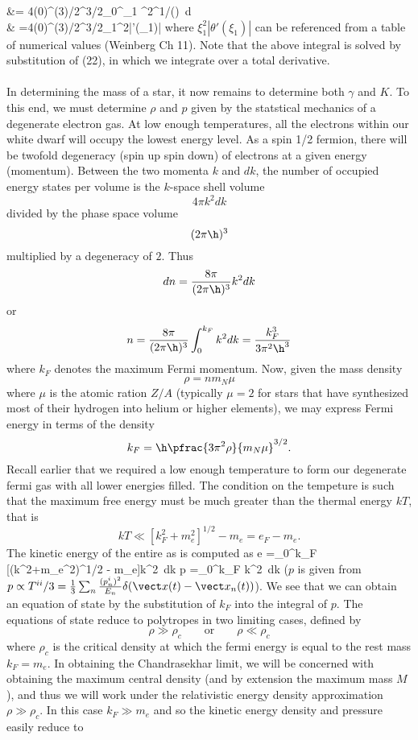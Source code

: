 \documentclass[10pt,letterpaper]{article}
\begin{document}
	&= 4\pi \rho(0)^{(3)/2}^{3/2}\int_0^{\xi_1} \xi^2\theta^{1/()}\ d\xi\\
	& =4\pi \rho(0)^{(3)/2}^{3/2}\xi_1^2|\theta'(\xi_1)|
\ea
where $\xi_1^2|\theta'(\xi_1)|$ can be referenced from a table of numerical values (Weinberg Ch 11). Note that the above integral is solved by substitution of (22), in which we integrate over a total derivative.
\\ \\
In determining the mass of a star, it now remains to determine both $\gamma$ and $K$. To this end, we must determine $\rho$ and $p$ given by the statstical mechanics of a degenerate electron gas. At low enough temperatures, all the electrons within our white dwarf will occupy the lowest energy level. As a spin 1/2 fermion, there will be twofold degeneracy (spin up spin down) of electrons at a given energy (momentum). Between the two momenta $k$ and $dk$, the number of occupied energy states per volume is the $k$-space shell volume
\[
	4\pi k^2 dk
\]
divided by the phase space volume
\[
	(2\pi \h)^{3}
\]
multiplied by a degeneracy of $2$. Thus
\[
	dn = \frac{8\pi}{(2\pi \h)^3} k^2 dk
\]
or
\[
	n =  \frac{8\pi}{(2\pi \h)^3}\int_0^{k_F} k^2 dk = \frac{k_F^3}{3\pi^2\h^3}
\]
where $k_F$ denotes the maximum Fermi momentum. Now, given the mass density
\[
	\rho = nm_N\mu
\]
where $\mu$ is the atomic ration $Z/A$ (typically $\mu=2$ for stars that have synthesized most of their hydrogen into helium or higher elements), we may express Fermi  energy in terms of the density
\[
	k_F = \h\pfrac{3\pi^2\rho}{m_N\mu}^{3/2}.
\]
Recall earlier that we required a low enough temperature to form our degenerate fermi gas with all lower energies filled. The condition on the tempeture is such that the maximum free energy must be much greater than the thermal energy $kT$, that is
\[
	kT \ll [k_F^2+m_e^2]^{1/2} - m_e = e_F - m_e.
\]
The kinetic energy of the entire as is computed as
\be
	e =\int_0^{k_F} [(k^2+m_e^2)^{1/2} - m_e]k^2\ dk
\ee
\be
	p =\int_0^{k_F} k^2\ dk
\ee
($p$ is given from $p \propto T^{ii}/3 = \frac13 \sum_n \frac{(p_n^i)^2}{E_n}\delta(\vect x(t) - \vect x_n(t))$). We see that we can obtain an equation of state by the substitution of $k_F$ into the integral of $p$. The equations of state reduce to polytropes in two limiting cases, defined by
\[
	\rho \gg \rho_c\qquad \text{or}\qquad \rho \ll \rho_c
\]
where $\rho_c$ is the critical density at which the fermi energy is equal to the rest mass $k_F = m_e$. In obtaining the Chandrasekhar limit, we will be concerned with obtaining the maximum central density (and by extension the maximum mass $M$), and thus we will work under the relativistic energy density approximation $\rho \gg \rho_c$. In this case $k_F \gg m_e$ and so the kinetic energy density and pressure easily reduce to
\end{document}
